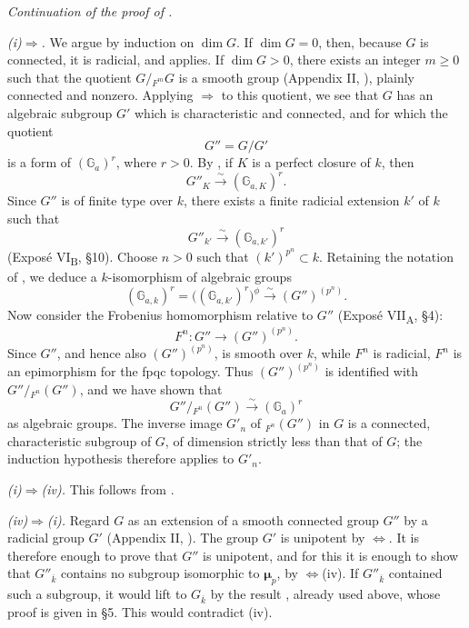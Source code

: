 
\medskip\noindent\textit{Continuation of the proof of .}

\medskip\noindent
\textit{(i)\(\Rightarrow\).}\quad
We argue by induction on \(\dim G\).  If \(\dim G=0\), then,
because \(G\) is connected, it is radicial, and  applies.
If \(\dim G>0\), there exists an integer \(m\geq0\) such that the
quotient \(G/{}_{F^m}G\) is a smooth group (Appendix II, ), plainly
connected and nonzero.  Applying
\(\Rightarrow\) to this quotient, we see that \(G\)
has an algebraic subgroup \(G'\) which is characteristic and
connected, and for which the quotient
\[
  G''=G/G'
\]
is a form of \((\mathbb G_a)^r\), where \(r>0\).  By , if
\(K\) is a perfect closure of \(k\), then
\[
  G''_K\xrightarrow{\sim}(\mathbb G_{a,K})^r.
\]
Since \(G''\) is of finite type over \(k\), there exists a finite
radicial extension \(k'\) of \(k\) such that
\[
  G''_{k'}\xrightarrow{\sim}(\mathbb G_{a,k'})^r
\]
(Exposé VI\textsubscript{B}, \S10).  Choose \(n>0\) such that
\((k')^{p^n}\subset k\).  Retaining the notation of , we
deduce a \(k\)-isomorphism of algebraic groups
\[
  (\mathbb G_{a,k})^r
   =\bigl((\mathbb G_{a,k'})^r\bigr)^\phi
   \xrightarrow{\sim}(G'')^{(p^n)}.
\]
Now consider the Frobenius homomorphism relative to \(G''\)
(Exposé VII\textsubscript{A}, \S4):
\[
  F^n:G''\longrightarrow(G'')^{(p^n)}.
\]
Since \(G''\), and hence also \((G'')^{(p^n)}\), is smooth over
\(k\), while \(F^n\) is radicial, \(F^n\) is an epimorphism for
the fpqc topology.  Thus \((G'')^{(p^n)}\) is identified with
\(G''/{}_{F^n}(G'')\), and we have shown that
\[
  G''/{}_{F^n}(G'')\xrightarrow{\sim}(\mathbb G_a)^r
\]
as algebraic groups.  The inverse image \(G'_n\) of \({}_{F^n}(G'')\)
in \(G\) is a connected, characteristic subgroup of \(G\), of
dimension strictly less than that of \(G\); the induction
hypothesis therefore applies to \(G'_n\).

\medskip\noindent
\textit{(i)\(\Rightarrow\)(iv).}\quad
This follows from .

\medskip\noindent
\textit{(iv)\(\Rightarrow\)(i).}\quad
Regard \(G\) as an extension of a smooth connected group \(G''\)
by a radicial group \(G'\) (Appendix II, ).  The group \(G'\)
is unipotent by \(\Leftrightarrow\).  It is therefore
enough to prove that \(G''\) is unipotent, and for this it is
enough to show that \(G''_{\overline{k}}\) contains no subgroup
isomorphic to \(\boldsymbol\mu_p\), by
\(\Leftrightarrow\)(iv).  If
\(G''_{\overline{k}}\) contained such a subgroup, it would lift
to \(G_{\overline{k}}\) by the result , already used above,
whose proof is given in \S5.  This would contradict (iv).

